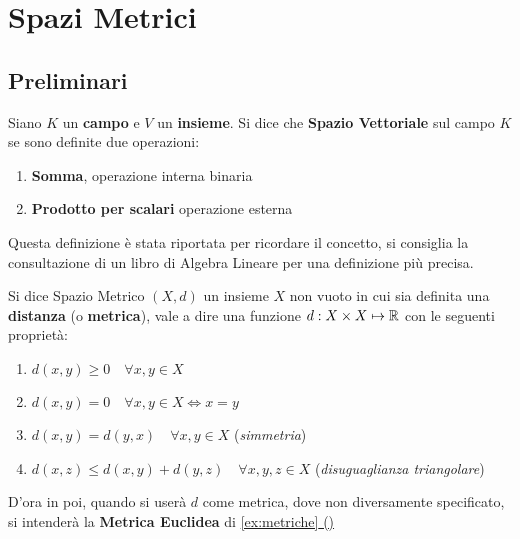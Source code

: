 \chapter{Spazi Metrici}

\section{Preliminari}

\begin{definition}
	Siano $K$ un \textbf{campo} e $V$ un \textbf{insieme}. Si dice che \textbf{Spazio Vettoriale} sul campo $K$ se sono definite due operazioni:
	\begin{enumerate}
		\item \textbf{Somma}, operazione interna binaria
		\item \textbf{Prodotto per scalari} operazione esterna
	\end{enumerate}
	\begin{note}
		Questa definizione è stata riportata per ricordare il concetto, si consiglia la consultazione di un libro di Algebra Lineare per una definizione più precisa.
	\end{note}
\end{definition}

\begin{definition}
	\label{def:sp_metrico}
	Si dice Spazio Metrico $(X,d)$ un insieme $X$ non vuoto in cui sia definita una \textbf{distanza} (o \textbf{metrica}), vale a dire una funzione $d: X \times X \mapsto \mathbb{R}$ con le seguenti proprietà:
	\begin{enumerate}
		\item $d(x,y) \geq 0 \quad \forall x,y \in X$
		\item $d(x,y) = 0 \quad \forall x,y \in X \iff x=y$
		\item $d(x,y) = d(y,x) \quad \forall x,y \in X$ \quad(\textit{simmetria})
		\item $d(x,z) \leq d(x,y)+d(y,z) \quad \forall x,y,z\in X$ \quad(\textit{disuguaglianza triangolare})
	\end{enumerate}
	\begin{note}
		D'ora in poi, quando si userà $d$ come metrica, dove non diversamente specificato, si intenderà la \textbf{Metrica Euclidea} di \hyperref[ex:dist_eucl]{\cref*{ex:metriche} ()} %
	\end{note}
\end{definition}

